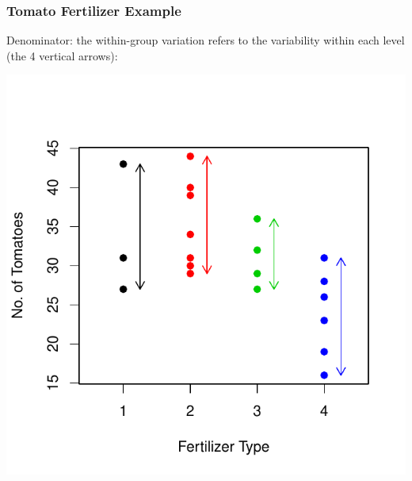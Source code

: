 \documentclass[handout]{beamer}
\newcommand{\blue}[1]{\textcolor{blue2}{#1}}
\begin{document}
\begin{frame}
\frametitle{Tomato Fertilizer Example}
Denominator: the \blue{within-group variation} refers to the variability \blue{within} each level (the 4 vertical arrows):
\begin{center}
\includegraphics{figure/lec22-005}
\end{center}
\end{frame}
\end{document}
